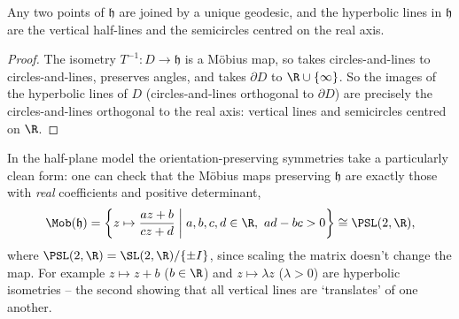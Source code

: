 \begin{corollary}
    Any two points of $\mathfrak{h}$ are joined by a unique geodesic, and the hyperbolic lines in $\mathfrak{h}$ are the vertical half-lines and the semicircles centred on the real axis.
\end{corollary}
\begin{proof}
    The isometry $T^{-1}: D \rightarrow \mathfrak{h}$ is a M\"obius map, so takes circles-and-lines to circles-and-lines, preserves angles, and takes $\partial D$ to $\R \cup \{\infty\}$. So the images of the hyperbolic lines of $D$ (circles-and-lines orthogonal to $\partial D$) are precisely the circles-and-lines orthogonal to the real axis: vertical lines and semicircles centred on $\R$.
\end{proof}
\begin{center}
\end{center}

In the half-plane model the orientation-preserving symmetries take a particularly clean form: one can check that the M\"obius maps preserving $\mathfrak{h}$ are exactly those with \emph{real} coefficients and positive determinant,
$$
\Mob(\mathfrak{h}) = \left\{z \mapsto \frac{az + b}{cz + d} \;\middle|\; a, b, c, d \in \R, \ ad - bc > 0 \right\} \cong \PSL(2, \R),
$$
where $\PSL(2, \R) = \SL(2, \R)/\{\pm I\}$, since scaling the matrix doesn't change the map. For example $z \mapsto z + b$ ($b \in \R$) and $z \mapsto \lambda z$ ($\lambda > 0$) are hyperbolic isometries -- the second showing that all vertical lines are `translates' of one another.

